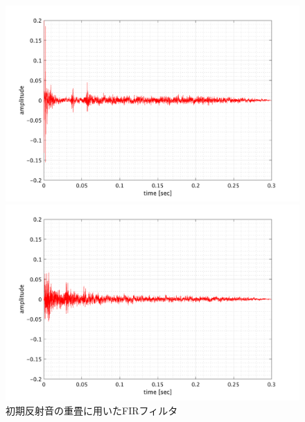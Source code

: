 \documentclass[11pt,a4j]{jreport}
\begin{document}
\begin{figure}[H]
  \begin{minipage}[b]{.5\linewidth}
    \centering
    \includegraphics[width=.8\linewidth]{images/convolutedIr/ER3.png}
  \end{minipage}%
  \begin{minipage}[b]{.5\linewidth}
    \centering
    \includegraphics[width=.8\linewidth]{images/convolutedIr/ER4.png}
  \end{minipage}

  \centering
  \caption{初期反射音の重畳に用いたFIRフィルタ}
  \label{fig:初期反射音の重畳に用いたFIRフィルタ}
\end{figure}
\end{document}
